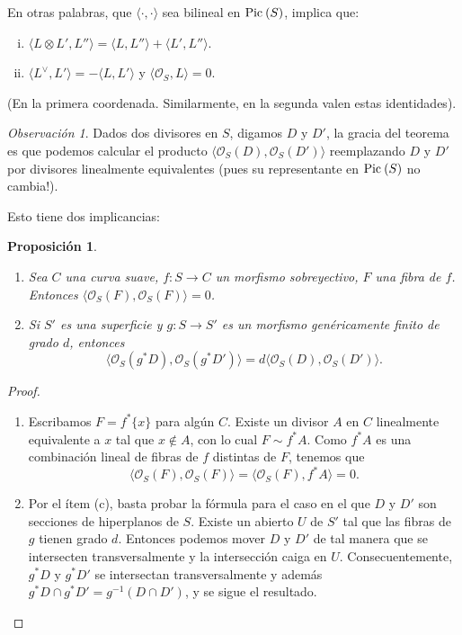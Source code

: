 \documentclass[spanish,12pt]{amsart}
\newcommand{\Pic}[1]{\textup{Pic}{ \: (#1)}}
\newtheorem{proposition}[theorem]{Proposición}
\theoremstyle{definition}
\theoremstyle{remark}
\newtheorem{remark}[theorem]{Observación}
\numberwithin{equation}{section}
\renewcommand{\O}{\mathcal{O}}
\begin{document}
En otras palabras, que $\langle \cdot, \cdot\rangle $ sea bilineal en $\Pic S$, implica que:
\begin{enumerate}[(i)]
\item $ \langle L \otimes L', L'' \rangle = \langle L , L'' \rangle  + \langle L', L''\rangle$.
\item $ \langle L^\vee, L'\rangle  = - \langle L, L'\rangle $ y $\langle \O_S, L\rangle  = 0$.
\end{enumerate}
(En la primera coordenada. Similarmente, en la segunda valen estas identidades).

\begin{remark}
Dados dos divisores en $S$, digamos $D$ y $D'$, la gracia del teorema es que podemos calcular el producto $\langle \O_S (D), \O_S (D')\rangle$ reemplazando $D$ y $D'$ por divisores linealmente equivalentes (pues su representante en $\Pic S$ no cambia!).
\end{remark}
Esto tiene dos implicancias:

\begin{proposition}
\begin{enumerate}[(1)]
\item Sea $C$ una curva suave, $f : S \to C$ un morfismo sobreyectivo, $F$ una fibra de $f$. Entonces $\langle \O_S (F), \O_S (F)\rangle  = 0$.
\item Si $S'$ es una superficie y $g : S \to S'$ es un morfismo genéricamente finito de grado $d$, entonces
\[
    \langle \O_S (g^* D), \O_S (g^* D')\rangle  = d \langle  \O_S (D), \O_S (D')\rangle .
\]
\end{enumerate}
\end{proposition}
\begin{proof}
\begin{enumerate}[(1)]
\item Escribamos $F = f^* \{x\}$ para algún $C$. Existe un divisor $A$ en $C$ linealmente equivalente a $x$ tal que $x \not \in A$, con lo cual $F \sim f^* A$. Como $f^* A$ es una combinación lineal de fibras de $f$ distintas de $F$, tenemos que
\[
    \langle \O_S (F), \O_S (F)\rangle  = \langle \O_S (F), f^* A\rangle  = 0.
\]
\item Por el ítem (c), basta probar la fórmula para el caso en el que $D$ y $D'$ son secciones de hiperplanos de $S$. Existe un abierto $U$ de $S'$ tal que las fibras de $g$ tienen grado $d$. Entonces podemos mover $D$ y $D'$ de tal manera que se intersecten transversalmente y la intersección caiga en $U$. Consecuentemente, $g^* D$ y $g^* D'$ se intersectan transversalmente y además $g^* D \cap g^* D' = g^{-1} (D \cap D')$, y se sigue el resultado.
\end{enumerate}
\end{proof}
\end{document}
